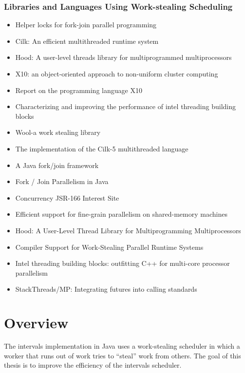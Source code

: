 \subsubsection{Libraries and Languages Using Work-stealing Scheduling}

\begin{itemize}
\item Helper locks for fork-join parallel programming
  \cite{Agrawal2010}
\item Cilk: An efficient multithreaded runtime system
  \cite{Blumofe1995}
\item Hood: A user-level threads library for multiprogrammed
  multiprocessors \cite{Blumofe1998}
\item X10: an object-oriented approach to non-uniform cluster
  computing \cite{Charles2005}
\item Report on the programming language X10 \cite{Saraswat2010}
\item Characterizing and improving the performance of intel threading
  building blocks \cite{Contreras2008}
\item Wool-a work stealing library \cite{Faxen2009}
\item The implementation of the Cilk-5 multithreaded language
  \cite{Frigo1998}
\item A Java fork/join framework \cite{Lea2000}
\item Fork / Join Parallelism in Java \cite{Lea2000a}
\item Concurrency JSR-166 Interest Site \cite{Lea}
\item Efficient support for fine-grain parallelism on shared-memory
  machines \cite{Lowenthal1998}
\item Hood: A User-Level Thread Library for Multiprogramming
  Multiprocessors \cite{Papadopoulos1998}
\item Compiler Support for Work-Stealing Parallel Runtime Systems
  \cite{Raman2009}
\item Intel threading building blocks: outfitting C++ for multi-core
  processor parallelism \cite{Reinders2007}
\item StackThreads/MP: Integrating futures into calling standards
  \cite{Taura1999}
\end{itemize}


\section{Overview}
\label{sec:intro-overview}

The intervals implementation in Java uses a work-stealing scheduler in
which a worker that runs out of work tries to ``steal'' work from
others. The goal of this thesis is to improve the efficiency of the
intervals scheduler.

